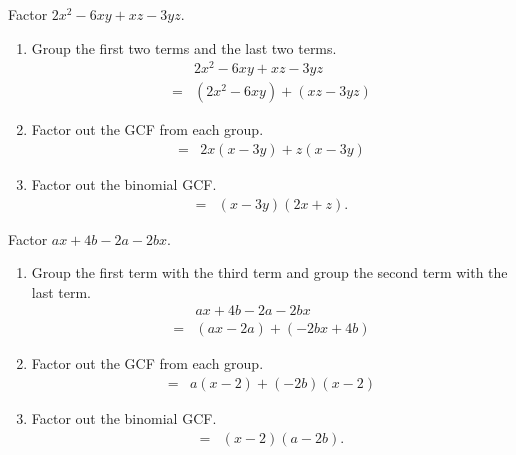 	\begin{multicols}{2}
		\begin{example}
			Factor $2x^2-6xy+xz-3yz$.
		\end{example}

		\begin{solution}
			\begin{enumerate}[label={\textbf{\textup{Step \arabic*.}}~}]
				\item Group the first two terms and the last two terms.
				      \[
					      \begin{split}
						      &2x^2-6xy+xz-3yz\\
						      =&(2x^2-6xy)+(xz-3yz)
					      \end{split}
				      \]
				\item Factor out the GCF from each group.
				      \[
					      \begin{split}
						      =&2x(x-3y)+z(x-3y)
					      \end{split}
				      \]
				\item Factor out the binomial GCF.
				      \[
					      \begin{split}
						      =&(x-3y)(2x+z).
					      \end{split}
				      \]
			\end{enumerate}
		\end{solution}


		\columnbreak

		\begin{example}
			Factor $ax+4b-2a-2bx$.
		\end{example}

		\begin{solution}
			\begin{enumerate}[label={\textbf{\textup{Step \arabic*.}}~}]
				\item Group the first term with the third term and group the second term with the last term.
				      \[
					      \begin{split}
						      &ax+4b-2a-2bx\\
						      =&(ax-2a)+(-2bx+4b)
					      \end{split}
				      \]
				\item Factor out the GCF from each group.
				      \[
					      \begin{split}
						      =&a(x-2)+(-2b)(x-2)
					      \end{split}
				      \]
				\item Factor out the binomial GCF.
				      \[
					      \begin{split}
						      =&(x-2)(a-2b).
					      \end{split}
				      \]
			\end{enumerate}
		\end{solution}
	\end{multicols}

